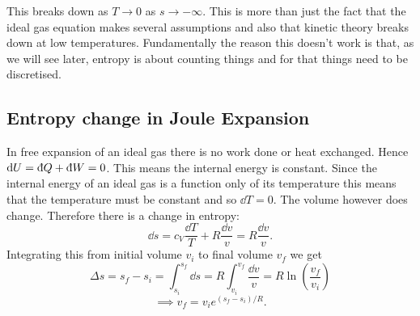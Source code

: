     This breaks down as \(T \to 0\) as \(s\to-\infty\).
    This is more than just the fact that the ideal gas equation makes several assumptions and also that kinetic theory breaks down at low temperatures.
    Fundamentally the reason this doesn't work is that, as we will see later, entropy is about counting things and for that things need to be discretised.
    
    \subsection{Entropy change in Joule Expansion}
    In free expansion of an ideal gas there is no work done or heat exchanged.
    Hence \(\dd{U} = \ddbar{Q} + \ddbar{W} = 0\).
    This means the internal energy is constant.
    Since the internal energy of an ideal gas is a function only of its temperature this means that the temperature must be constant and so \(\dd{T} = 0\).
    The volume however does change.
    Therefore there is a change in entropy:
    \[\dd{s} = c_V\frac{\dd{T}}{T} + R\frac{\dd{v}}{v} = R\frac{\dd{v}}{v}.\]
    Integrating this from initial volume \(v_i\) to final volume \(v_f\) we get
    \[\Delta s = s_f - s_i = \int_{s_i}^{s_f}\dd{s} = R\int_{v_i}^{v_f}\frac{\dd{v}}{v} = R\ln\left(\frac{v_f}{v_i}\right)\]
    \[\implies v_f = v_ie^{(s_f - s_i)/R}.\]
    

